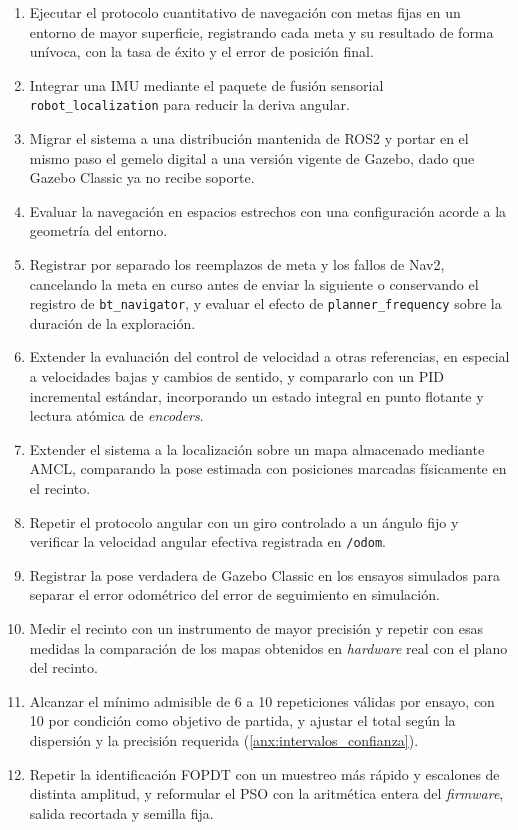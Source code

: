 \begin{enumerate}
\item Ejecutar el protocolo cuantitativo de navegación con metas fijas en un entorno de mayor superficie, registrando cada meta y su resultado de forma unívoca, con la tasa de éxito y el error de posición final.
\item Integrar una \gls{IMU} mediante el paquete de fusión sensorial \texttt{robot\_localization} para reducir la deriva angular.
\item Migrar el sistema a una distribución mantenida de \gls{ROS2} y portar en el mismo paso el gemelo digital a una versión vigente de Gazebo, dado que Gazebo Classic ya no recibe soporte.
\item Evaluar la navegación en espacios estrechos con una configuración acorde a la geometría del entorno.
\item Registrar por separado los reemplazos de meta y los fallos de Nav2, cancelando la meta en curso antes de enviar la siguiente o conservando el registro de \texttt{bt\_navigator}, y evaluar el efecto de \texttt{planner\_frequency} sobre la duración de la exploración.
\item Extender la evaluación del control de velocidad a otras referencias, en especial a velocidades bajas y cambios de sentido, y
compararlo con un PID incremental estándar, incorporando un estado integral en
punto flotante y lectura atómica de \textit{encoders}.
\item Extender el sistema a la localización sobre un mapa almacenado mediante AMCL, comparando la pose estimada con posiciones marcadas físicamente en el recinto.
\item Repetir el protocolo angular con un giro controlado a un ángulo fijo y verificar la velocidad angular efectiva registrada en \texttt{/odom}.
\item Registrar la pose verdadera de Gazebo Classic en los ensayos simulados para separar el error odométrico del error de seguimiento en simulación.
\item Medir el recinto con un instrumento de mayor precisión y repetir con esas medidas la comparación de los mapas obtenidos en \textit{hardware} real con el plano del recinto.
\item Alcanzar el mínimo admisible de 6 a 10 repeticiones válidas por ensayo, con 10 por condición como objetivo de partida, y ajustar el total según la dispersión y la precisión requerida (\ref{anx:intervalos_confianza}).
\item Repetir la identificación FOPDT con un muestreo más rápido y escalones de distinta amplitud, y reformular el PSO con la aritmética entera del \textit{firmware}, salida recortada y semilla fija.
\end{enumerate}
